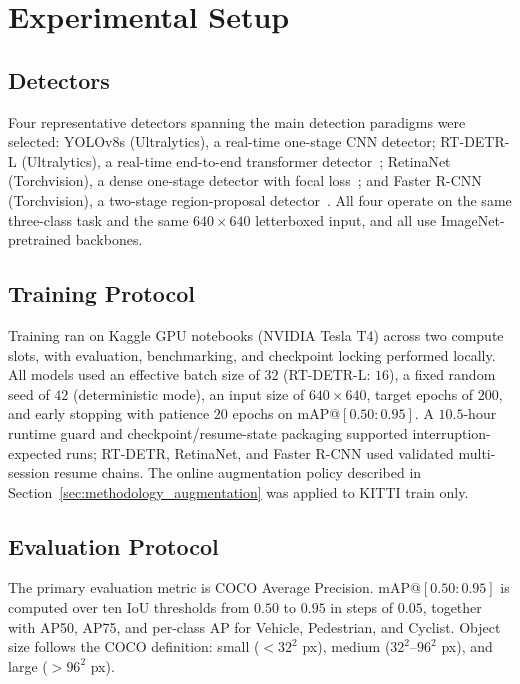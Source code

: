 \section{Experimental Setup}
\label{sec:experimental_setup}

\subsection{Detectors}
\label{sec:setup_detectors}

Four representative detectors spanning the main detection paradigms were selected: YOLOv8s
(Ultralytics), a real-time one-stage CNN detector; RT-DETR-L (Ultralytics), a real-time
end-to-end transformer detector~\cite{zhao2024rtdetr}; RetinaNet (Torchvision), a dense
one-stage detector with focal loss~\cite{lin2017focalloss}; and Faster R-CNN (Torchvision),
a two-stage region-proposal detector~\cite{ren2015fasterrcnn}. All four operate on the
same three-class task and the same $640\times640$ letterboxed input, and all use
ImageNet-pretrained backbones.

\subsection{Training Protocol}
\label{sec:setup_training}

Training ran on Kaggle GPU notebooks (NVIDIA Tesla T4) across two compute slots, with
evaluation, benchmarking, and checkpoint locking performed locally. All models used an
effective batch size of $32$ (RT-DETR-L: $16$), a fixed random seed of $42$
(deterministic mode), an input size of $640\times640$, target epochs of $200$, and early
stopping with patience $20$ epochs on mAP@$[0.50{:}0.95]$. A $10.5$-hour runtime guard and
checkpoint/resume-state packaging supported interruption-expected runs; RT-DETR, RetinaNet,
and Faster R-CNN used validated multi-session resume chains. The online augmentation
policy described in Section~\ref{sec:methodology_augmentation} was applied to KITTI train
only.

\subsection{Evaluation Protocol}
\label{sec:setup_evaluation}

The primary evaluation metric is COCO Average Precision. mAP@$[0.50{:}0.95]$ is computed
over ten IoU thresholds from $0.50$ to $0.95$ in steps of $0.05$, together with AP50,
AP75, and per-class AP for Vehicle, Pedestrian, and Cyclist. Object size follows the COCO
definition: small ($<32^2$ px), medium ($32^2$--$96^2$ px), and large ($>96^2$ px).

